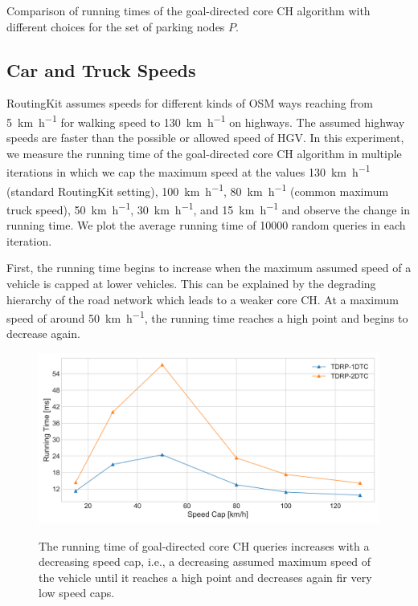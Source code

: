 \begin{table}[hbtp]
	\centering
	
	\caption{Comparison of running times of the goal-directed core CH algorithm with different choices for the set of parking nodes $P$.}
	\label{tbl:parking_set_times}
\end{table}

\subsection{Car and Truck Speeds}
RoutingKit assumes speeds for different kinds of OSM ways reaching from \SI[per-mode = symbol]{5}{\kilo\meter\per\hour} for walking speed to \SI[per-mode = symbol]{130}{\kilo\meter\per\hour} on highways. The assumed highway speeds are faster than the possible or allowed speed of HGV. In this experiment, we measure the running time of the goal-directed core CH algorithm in multiple iterations in which we cap the maximum speed at the values \SI[per-mode = symbol]{130}{\kilo\meter\per\hour} (standard RoutingKit setting), \SI[per-mode = symbol]{100}{\kilo\meter\per\hour}, \SI[per-mode = symbol]{80}{\kilo\meter\per\hour} (common maximum truck speed), \SI[per-mode = symbol]{50}{\kilo\meter\per\hour}, \SI[per-mode = symbol]{30}{\kilo\meter\per\hour}, and \SI[per-mode = symbol]{15}{\kilo\meter\per\hour} and observe the change in running time. We plot the average running time of \num{10000} random queries in each iteration.

First, the running time begins to increase when the maximum assumed speed of a vehicle is capped at lower vehicles. This can be explained by the degrading hierarchy of the road network which leads to a weaker core CH. At a maximum speed of around \SI[per-mode = symbol]{50}{\kilo\meter\per\hour}, the running time reaches a high point and begins to decrease again.

\begin{figure}[hbtp]
	\centering
	\includegraphics[width=.95\textwidth]{plots/thesis_speed_cap.png}
	\label{fig:truck_speed_limit}
	\caption{The running time of goal-directed core CH queries increases with a decreasing speed cap, i.e., a decreasing assumed maximum speed of the vehicle until it reaches a high point and decreases again fir very low speed caps.}
\end{figure}

